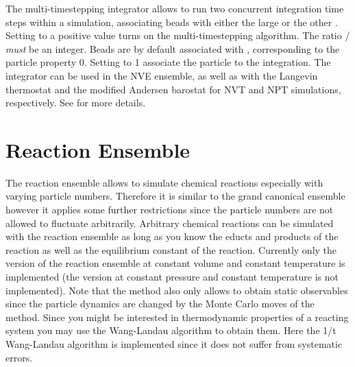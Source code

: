 The multi-timestepping integrator allows to run two concurrent integration time
steps within a simulation, associating beads with either the large
 or the other .  Setting
 to a positive value turns on the multi-timestepping
algorithm.  The ratio / \emph{must} be
an integer.  Beads are by default associated with ,
corresponding to the particle property  0.  Setting
 to 1 associate the particle to the
 integration.  The integrator can be used in the NVE
ensemble, as well as with the Langevin thermostat and the modified Andersen
barostat for NVT and NPT simulations, respectively.  See \cite{bereau15} for
more details.

\section{Reaction Ensemble}
The reaction ensemble\cite{smith1994reaction} allows to simulate chemical reactions especially with varying particle numbers.  Therefore it is similar to the grand canonical ensemble however it applies some further restrictions since the particle numbers are not allowed to fluctuate arbitrarily. Arbitrary chemical reactions can be simulated with the reaction ensemble as long as you know the educts and products of the reaction as well as the equilibrium constant of the reaction. Currently only the version of the reaction ensemble at constant volume and constant temperature is implemented (the version at constant pressure and constant temperature is not implemented). Note that the method also only allows to obtain static observables since the particle dynamics are changed by the Monte Carlo moves of the method.
Since you might be interested in thermodynamic properties of a reacting system you may use the Wang-Landau algorithm\cite{wang2001efficient} to obtain them. Here the 1/t Wang-Landau algorithm\cite{belardinelli2007fast} is implemented since it does not suffer from systematic errors.


